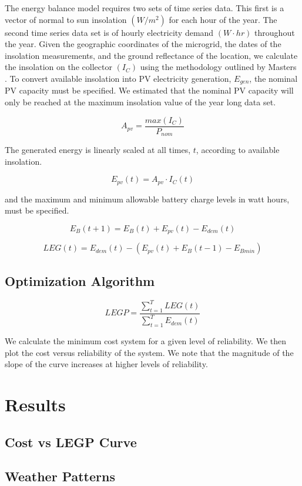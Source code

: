 \documentclass{article}
\begin{document}
The energy balance model requires two sets of time series data. 
This first is a vector of normal to sun insolation $\unit{(W/m^2)}$ for each hour of the year. The second time series data set is of hourly electricity demand $\unit{(W\cdot hr)}$ throughout the year. 
Given the geographic coordinates of the microgrid, the dates of the insolation measurements, and the ground reflectance of the location, we calculate the insolation on the collector $(I_C)$ using the methodology outlined by Masters \cite{}. To convert available insolation into PV electricity generation, $E_{gen}$, the nominal PV capacity must be specified. We estimated that the nominal PV capacity will only be reached at the maximum insolation value of the year long data set. 

\begin{equation}
A_{pv} = \frac{max(I_C)}{P_{nom}}
\end{equation}

The generated energy is linearly scaled at all times, $t$, according to available insolation. 

\begin{equation}
E_{pv}(t) = A_{pv} \cdot I_C(t)
\end{equation}


and the maximum and minimum allowable battery charge levels in watt hours, must be specified.


\begin{equation}
E_B (t+1) = E_B (t) + E_{pv} (t) - E_{dem} (t)
\end{equation}


\begin{equation}
LEG(t) = E_{dem} (t) - (E_{pv} (t)+E_B(t-1)-E_{Bmin})
\end{equation}


\subsection{Optimization Algorithm}



\begin{equation}
LEGP = \frac{\sum_{t=1}^T LEG(t)}{\sum_{t=1}^T E_{dem} (t)}
\end{equation}





We calculate the minimum cost system for a given level of reliability.
We then plot the cost versus reliability of the system.
We note that the magnitude of the slope of the curve increases at higher
levels of reliability.


\section{Results}
\subsection{Cost vs LEGP Curve}
\subsection{Weather Patterns}
\end{document}
